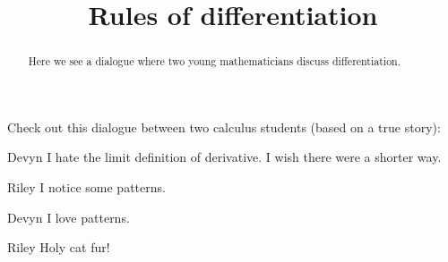 \documentclass{ximera}
\title[Break-Ground:]{Rules of differentiation}
\begin{document}
\begin{abstract}
Here we see a dialogue where two young mathematicians discuss differentiation.
\end{abstract}
\maketitle

Check out this dialogue between two calculus students (based on a true
story):

\begin{dialogue}
\item[Devyn] I hate the limit definition of derivative.  I wish there were a shorter way.
\item[Riley] I notice some patterns.
\item[Devyn] I love patterns.
\item[Riley] Holy cat fur!
\end{dialogue}




\end{document}
